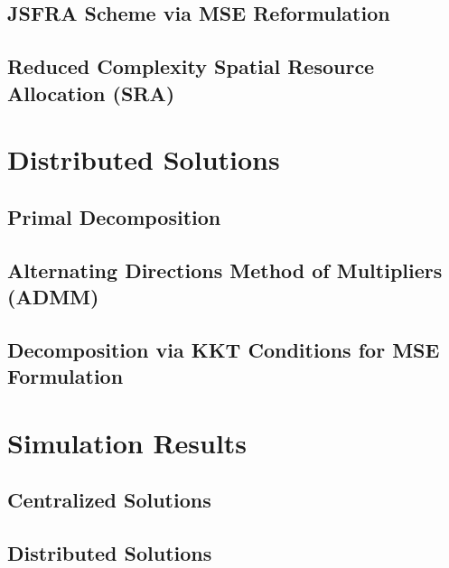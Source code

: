 \documentclass[10pt,journal,final,letterpaper,twocolumn]{./../IEEE/IEEEtran/IEEEtran}
\begin{document}


\subsection{\ac{JSFRA} Scheme via \ac{MSE} Reformulation} \label{sec-3.3}


\subsection{Reduced Complexity Spatial Resource Allocation (\acs{SRA})} \label{sec-3.4}
{

\section{Distributed Solutions} \label{sec-4}


\subsection{Primal Decomposition} \label{sec-4.1}


\subsection{Alternating Directions Method of Multipliers (ADMM)} \label{sec-4.2}


\subsection{Decomposition via \ac{KKT} Conditions for \ac{MSE} Formulation} \label{sec-4.3}


\section{Simulation Results} \label{sec-5}


\subsection{Centralized Solutions}


\subsection{Distributed Solutions} \label{sec-5.2}


}
\end{document}
